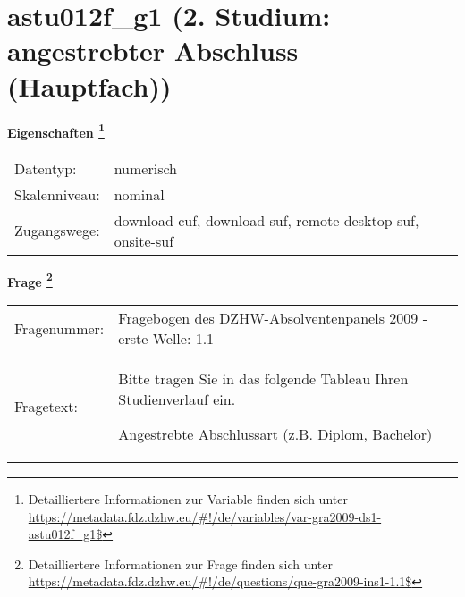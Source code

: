 
    \setcounter{footnote}{0}

    \vspace*{-1.8cm}
	\section{astu012f\_g1 (2. Studium: angestrebter Abschluss (Hauptfach))}
	\label{section:astu012f_g1}



    \vspace*{0.5cm}
    \noindent\textbf{Eigenschaften
	\footnote{Detailliertere Informationen zur Variable finden sich unter
		\url{https://metadata.fdz.dzhw.eu/\#!/de/variables/var-gra2009-ds1-astu012f_g1$}}}\\
	\begin{tabularx}{\hsize}{@{}lX}
	Datentyp: & numerisch \\
	Skalenniveau: & nominal \\
	Zugangswege: &
	  download-cuf, 
	  download-suf, 
	  remote-desktop-suf, 
	  onsite-suf
 \\
    \end{tabularx}



				\vspace*{0.5cm}
                \noindent\textbf{Frage
	                \footnote{Detailliertere Informationen zur Frage finden sich unter
		              \url{https://metadata.fdz.dzhw.eu/\#!/de/questions/que-gra2009-ins1-1.1$}}}\\
				\begin{tabularx}{\hsize}{@{}lX}
					Fragenummer: &
					  Fragebogen des DZHW-Absolventenpanels 2009 - erste Welle:
					  1.1
 \\
					Fragetext: & Bitte tragen Sie in das folgende Tableau Ihren Studienverlauf ein.\par  Angestrebte Abschlussart (z.B. Diplom, Bachelor) \\
				\end{tabularx}





